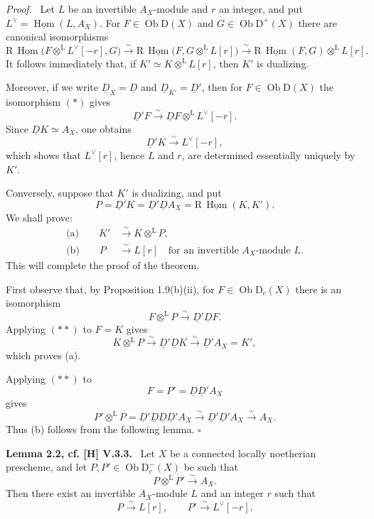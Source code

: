 \documentclass[12pt]{article}
\newcommand{\Hom}{\operatorname{Hom}}
\newcommand{\ob}{\operatorname{Ob}}
\newcommand{\D}{\mathrm D}
\newcommand{\R}{\mathrm R}
\newcommand{\qedtext}{\hfill$\square$}
\newenvironment{statement}[1]{\par\medskip\noindent\textbf{#1.}\ }{\par\medskip}
\newenvironment{prooftext}[1][Proof]{\par\noindent\emph{#1.}\ }{\par\medskip}
\begin{document}
\begin{prooftext}
Let $L$ be an invertible $A_X$-module and $r$ an integer, and put $L^\vee=\underline{\Hom}(L,A_X)$. For $F\in\ob\D(X)$ and $G\in\ob\D^+(X)$ there are canonical isomorphisms
\[
\R\,\underline{\Hom}\bigl(F\otimes^{\mathrm L}L^\vee[-r],G\bigr)
   \xrightarrow{\sim}
\R\,\underline{\Hom}\bigl(F,G\otimes^{\mathrm L}L[r]\bigr)
   \xrightarrow{\sim}
\R\,\underline{\Hom}(F,G)\otimes^{\mathrm L}L[r]. \tag{*}
\]
It follows immediately that, if $K'\simeq K\otimes^{\mathrm L}L[r]$, then $K'$ is dualizing.

Moreover, if we write $\underline D_X=\underline D$ and $\underline D_{K'}=\underline D'$, then for $F\in\ob\D(X)$ the isomorphism $(*)$ gives
\[
   \underline D'F\xrightarrow{\sim}\underline DF\otimes^{\mathrm L}L^\vee[-r].
\]
Since $\underline DK\simeq A_X$, one obtains
\[
   \underline D'K\xrightarrow{\sim}L^\vee[-r],
\]
which shows that $L^\vee[r]$, hence $L$ and $r$, are determined essentially uniquely by $K'$.

Conversely, suppose that $K'$ is dualizing, and put
\[
   P=\underline D'K=\underline D'\underline DA_X=\R\,\underline{\Hom}(K,K').
\]
We shall prove:
\begin{align*}
\text{(a)}\qquad K'&\xrightarrow{\sim}K\otimes^{\mathrm L}P,\\
\text{(b)}\qquad P&\xrightarrow{\sim}L[r]\quad\text{for an invertible }A_X\text{-module }L.
\end{align*}
This will complete the proof of the theorem.

First observe that, by Proposition 1.9(b)(ii), for $F\in\ob\D_c(X)$ there is an isomorphism
\[
   F\otimes^{\mathrm L}P\xrightarrow{\sim}\underline D'\underline DF. \tag{**}
\]
Applying $(**)$ to $F=K$ gives
\[
   K\otimes^{\mathrm L}P\xrightarrow{\sim}\underline D'\underline DK\xrightarrow{\sim}\underline D'A_X=K',
\]
which proves (a).

Applying $(**)$ to
\[
   F=P'=\underline D\underline D'A_X
\]
gives
\[
   P'\otimes^{\mathrm L}P
      =\underline D'\underline D\underline D\underline D'A_X
      \xrightarrow{\sim}\underline D'\underline D'A_X
      \xrightarrow{\sim}A_X.
\]
Thus (b) follows from the following lemma. \qedtext
\end{prooftext}

\begin{statement}{Lemma 2.2, cf. [H] V.3.3}
Let $X$ be a connected locally noetherian prescheme, and let $P,P'\in\ob\D_c^-(X)$ be such that
\[
   P\otimes^{\mathrm L}P'\xrightarrow{\sim}A_X.
\]
Then there exist an invertible $A_X$-module $L$ and an integer $r$ such that
\[
   P\xrightarrow{\sim}L[r],\qquad P'\xrightarrow{\sim}L^\vee[-r].
\]
\end{statement}
\end{document}
